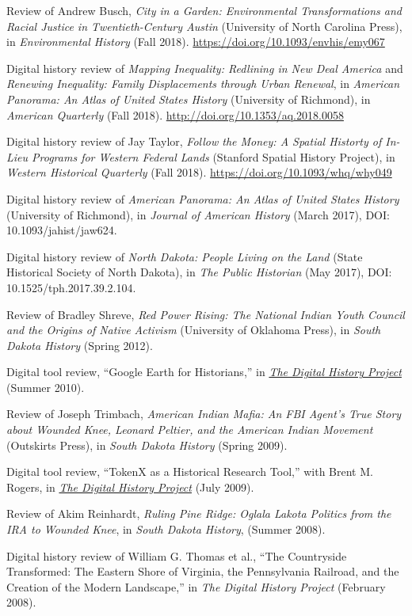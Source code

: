 Review of Andrew Busch, \emph{City in a Garden: Environmental
Transformations and Racial Justice in Twentieth-Century Austin}
(University of North Carolina Press), in \emph{Environmental History}
(Fall 2018). \url{https://doi.org/10.1093/envhis/emy067}

Digital history review of \emph{Mapping Inequality: Redlining in New
Deal America} and \emph{Renewing Inequality: Family Displacements
through Urban Renewal}, in \emph{American Panorama: An Atlas of United
States History} (University of Richmond), in \emph{American Quarterly}
(Fall 2018). \url{http://doi.org/10.1353/aq.2018.0058}

Digital history review of Jay Taylor, \emph{Follow the Money: A Spatial
Historty of In-Lieu Programs for Western Federal Lands} (Stanford
Spatial History Project), in \emph{Western Historical Quarterly} (Fall
2018). \url{https://doi.org/10.1093/whq/why049}

Digital history review of \emph{American Panorama: An Atlas of United
States History} (University of Richmond), in \emph{Journal of American
History} (March 2017), DOI: 10.1093/jahist/jaw624.

Digital history review of \emph{North Dakota: People Living on the Land}
(State Historical Society of North Dakota), in \emph{The Public
Historian} (May 2017), DOI: 10.1525/tph.2017.39.2.104.

Review of Bradley Shreve, \emph{Red Power Rising: The National Indian
Youth Council and the Origins of Native Activism} (University of
Oklahoma Press), in \emph{South Dakota History} (Spring 2012).

Digital tool review, ``Google Earth for Historians,'' in
\emph{\href{http://digitalhistory.unl.edu/t-reviews/geheppler.php}{The
Digital History Project}} (Summer 2010).

Review of Joseph Trimbach, \emph{American Indian Mafia: An FBI Agent's
True Story about Wounded Knee, Leonard Peltier, and the American Indian
Movement} (Outskirts Press), in \emph{South Dakota History} (Spring
2009).

Digital tool review, ``TokenX as a Historical Research Tool,'' with
Brent M. Rogers, in
\emph{\href{http://digitalhistory.unl.edu/t-reviews/tokenxhepplerrogers.php}{The
Digital History Project}} (July 2009).

Review of Akim Reinhardt, \emph{Ruling Pine Ridge: Oglala Lakota
Politics from the IRA to Wounded Knee}, in \emph{South Dakota History},
(Summer 2008).

Digital history review of William G. Thomas et al., ``The Countryside
Transformed: The Eastern Shore of Virginia, the Pennsylvania Railroad,
and the Creation of the Modern Landscape,'' in \emph{The Digital History
Project} (February 2008).

